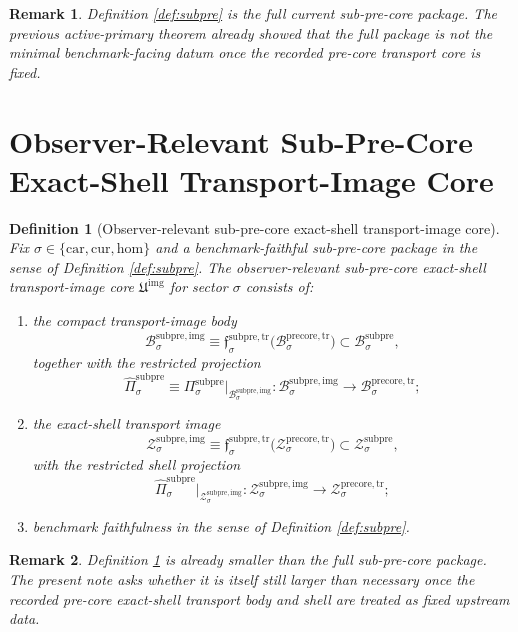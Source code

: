 \documentclass[11pt]{article}
\newcommand{\Car}{\mathrm{car}}
\newcommand{\Cur}{\mathrm{cur}}
\newcommand{\Hom}{\mathrm{hom}}
\newcommand{\PreCoreTrBody}[1]{\mathcal B_{#1}^{\mathrm{precore,tr}}}
\newcommand{\PreCoreTrShell}[1]{\mathcal Z_{#1}^{\mathrm{precore,tr}}}
\newcommand{\SubPreCoreBody}[1]{\mathcal B_{#1}^{\mathrm{subpre}}}
\newcommand{\SubPreCoreProj}[1]{\Pi_{#1}^{\mathrm{subpre}}}
\newcommand{\SubPreCoreTransportMin}[1]{\mathfrak f_{#1}^{\mathrm{subpre,tr}}}
\newcommand{\SubPreCoreShellSet}[1]{\mathcal Z_{#1}^{\mathrm{subpre}}}
\newcommand{\SubPreImageCore}{\mathfrak U^{\mathrm{img}}}
\newcommand{\SubPreImgBody}[1]{\mathcal B_{#1}^{\mathrm{subpre,img}}}
\newcommand{\SubPreImgProj}[1]{\widehat{\Pi}_{#1}^{\mathrm{subpre}}}
\newcommand{\SubPreImgShell}[1]{\mathcal Z_{#1}^{\mathrm{subpre,img}}}
\newtheorem{definition}{Definition}
\newtheorem{remark}{Remark}
\begin{document}
\begin{remark}
Definition \ref{def:subpre} is the full current sub-pre-core package. The previous active-primary theorem already showed that the full package is not the minimal benchmark-facing datum once the recorded pre-core transport core is fixed.
\end{remark}

\section{Observer-Relevant Sub-Pre-Core Exact-Shell Transport-Image Core}

\begin{definition}[Observer-relevant sub-pre-core exact-shell transport-image core]
\label{def:imagecore}
Fix \(\sigma\in\{\Car,\Cur,\Hom\}\) and a benchmark-faithful sub-pre-core package in the sense of Definition \ref{def:subpre}. The \emph{observer-relevant sub-pre-core exact-shell transport-image core} \(\SubPreImageCore\) for sector \(\sigma\) consists of:
\begin{enumerate}
    \item the compact transport-image body
    \[
    \SubPreImgBody{\sigma}
    \equiv
    \SubPreCoreTransportMin{\sigma}\bigl(\PreCoreTrBody{\sigma}\bigr)
    \subset
    \SubPreCoreBody{\sigma},
    \]
    together with the restricted projection
    \[
    \SubPreImgProj{\sigma}
    \equiv
    \SubPreCoreProj{\sigma}\big|_{\SubPreImgBody{\sigma}}
    :
    \SubPreImgBody{\sigma}\to\PreCoreTrBody{\sigma};
    \]
    \item the exact-shell transport image
    \[
    \SubPreImgShell{\sigma}
    \equiv
    \SubPreCoreTransportMin{\sigma}\bigl(\PreCoreTrShell{\sigma}\bigr)
    \subset
    \SubPreCoreShellSet{\sigma},
    \]
    with the restricted shell projection
    \[
    \SubPreImgProj{\sigma}\big|_{\SubPreImgShell{\sigma}}
    :
    \SubPreImgShell{\sigma}\to\PreCoreTrShell{\sigma};
    \]
    \item benchmark faithfulness in the sense of Definition \ref{def:subpre}.
\end{enumerate}
\end{definition}

\begin{remark}
Definition \ref{def:imagecore} is already smaller than the full sub-pre-core package. The present note asks whether it is itself still larger than necessary once the recorded pre-core exact-shell transport body and shell are treated as fixed upstream data.
\end{remark}
\end{document}
